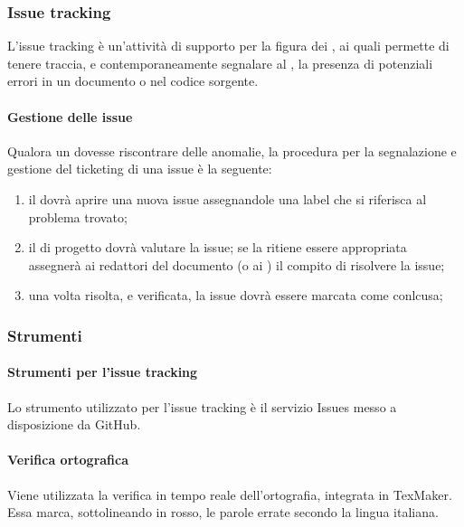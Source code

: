 \subsubsection{Issue tracking}
L'issue tracking è un'attività di supporto per la figura dei \VERP, ai quali permette di tenere traccia, e contemporaneamente segnalare al \RESP, la presenza di potenziali errori in un documento o nel codice sorgente.
 \paragraph{Gestione delle issue}
Qualora un \VER{} dovesse riscontrare delle anomalie, la procedura per la segnalazione e gestione del ticketing di una issue è la seguente:
\begin{enumerate}
	\item il \VER{} dovrà aprire una nuova issue assegnandole una label che si riferisca al problema trovato;
	\item il \RESP{} di progetto dovrà valutare la issue; se la ritiene essere appropriata assegnerà ai redattori del documento (o ai \PRP) il compito di risolvere la issue;
	\item una volta risolta, e verificata, la issue dovrà essere marcata come conlcusa;
\end{enumerate}
\subsubsection{Strumenti}
\paragraph{Strumenti per l'issue tracking}
Lo strumento utilizzato per l'issue tracking è il servizio Issues messo a disposizione da GitHub.
\paragraph{Verifica ortografica}
Viene utilizzata la verifica in tempo reale dell'ortografia, integrata in TexMaker. Essa marca,
sottolineando in rosso, le parole errate secondo la lingua italiana.
